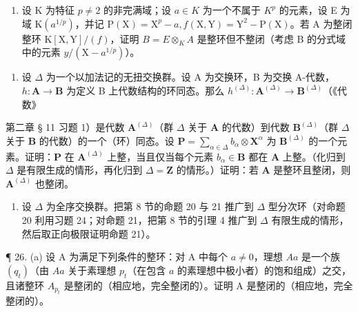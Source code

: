 \begin{enumerate}
\def\labelenumi{(\alph{enumi})}
\setcounter{enumi}{1}
\tightlist
\item
  设 K 为特征 \(p \neq 2\) 的非完满域；设 \(a \in K\) 为一个不属于 \(K^{p}\) 的元素，设 E 为域 \(\mathrm{K}(a^{1/p})\)，并记 \(\mathrm{P}(\mathrm{X}) = \mathrm{X}^{p} - a, f(\mathrm{X}, \mathrm{Y}) = \mathrm{Y}^{2} - \mathrm{P}(\mathrm{X})\)。若 A 为整闭整环 \(\mathrm{K}[\mathrm{X}, \mathrm{Y}]/(f)\)，证明 \(B = E \otimes_{K} A\) 是整环但不整闭（考虑 B 的分式域中的元素 \(y/(\mathrm{X} - a^{1/p})\)）。
\end{enumerate}

\begin{enumerate}
\def\labelenumi{\arabic{enumi}.}
\setcounter{enumi}{23}
\tightlist
\item
  设 \(\Delta\) 为一个以加法记的无扭交换群。设 A 为交换环，B 为交换 A-代数，\(h\colon\mathbf{A}\to\mathbf{B}\) 为定义 B 上代数结构的环同态。那么 \(h^{(\Delta)}\colon\mathbf{A}^{(\Delta)}\to\mathbf{B}^{(\Delta)}\)（《代数》
\end{enumerate}

第二章 § 11 习题 1）是代数 \(\mathbf{A}^{(\Delta)}\)（群 \(\Delta\) 关于 \(\mathbf{A}\) 的代数）到代数 \(\mathbf{B}^{(\Delta)}\)（群 \(\Delta\) 关于 \(\mathbf{B}\) 的代数）的一个（环）同态。设 \(\mathbf{P} = \sum_{\alpha \in \Delta} b_{\alpha} \otimes \mathbf{X}^{\alpha}\) 为 \(\mathbf{B}^{(\Delta)}\) 的一个元素。证明：\(\mathbf{P}\) 在 \(\mathbf{A}^{(\Delta)}\) 上整，当且仅当每个元素 \(b_{\alpha} \in \mathbf{B}\) 都在 \(\mathbf{A}\) 上整。（化归到 \(\Delta\) 是有限生成的情形，再化归到 \(\Delta = \mathbf{Z}\) 的情形。）证明：若 \(\mathbf{A}\) 是整环且整闭，则 \(\mathbf{A}^{(\Delta)}\) 也整闭。

\begin{enumerate}
\def\labelenumi{\arabic{enumi}.}
\setcounter{enumi}{24}
\tightlist
\item
  设 \(\Delta\) 为全序交换群。把第 8 节的命题 20 与 21 推广到 \(\Delta\) 型分次环（对命题 20 利用习题 24；对命题 21，把第 8 节的引理 4 推广到 \(\Delta\) 有限生成的情形，然后取正向极限证明命题 21）。
\end{enumerate}

¶ 26. (a) 设 A 为满足下列条件的整环：对 A 中每个 \(a \neq 0\)，理想 \(Aa\) 是一个族 \((q_t)\)（由 \(Aa\) 关于素理想 \(p_t\)（在包含 \(a\) 的素理想中极小者）的饱和组成）之交，且诸整环 \(A_{p_t}\) 是整闭的（相应地，完全整闭的）。证明 A 是整闭的（相应地，完全整闭的）。

